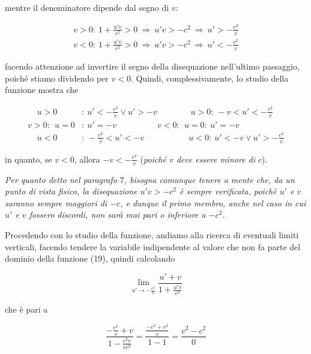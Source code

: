 \documentclass{article}
\begin{document}
mentre il denominatore dipende dal segno di \(v\):

\begin{align*}
    v > 0:\ 1 + \frac{u'v}{c^2} > 0\ \Rightarrow\ u'v > -c^2\ \Rightarrow\ u' > - \frac{c^2}{v} \\
    v < 0:\ 1 + \frac{u'v}{c^2} > 0\ \Rightarrow\ u'v > -c^2\ \Rightarrow\ u' < - \frac{c^2}{v}
\end{align*}

facendo attenzione ad invertire il segno della disequazione
nell'ultimo passaggio, poiché stiamo dividendo per \(v < 0\).
Quindi, complessivamente, lo studio della funzione mostra che

\begin{align*}
    \ \ \ \ \ u > 0 &:\ u' < - \frac{c^2}{v} \vee u' > -v\ \ \ \ \ \ \ \ \ \ \ \ \ \ \ \ \ \ u > 0 :\ -v < u' < - \frac{c^2}{v} \\
    v > 0:\ \ u = 0 &:\ u' = -v\ \ \ \ \ \ \ \ \ \ \ \ \ \ \ \ \ \ \ \ \ \ v < 0:\ \ u = 0 :\ u' = -v \\
    \ \ \ \ \ u < 0 &:\ - \frac{c^2}{v} < u' < -v\ \ \ \ \ \ \ \ \ \ \ \ \ \ \ \ \ \ \ \ \ \ \ \ u < 0 :\ u' < -v \vee u' > - \frac{c^2}{v}
\end{align*}

in quanto, se \(v < 0\), allora \(-v < - \frac{c^2}{v}\)
(\textit{poiché \(v\) deve essere minore di \(c\)}).\hfill\break

\textit{Per quanto detto nel paragrafo \(7\), bisogna comunque
tenere a mente che, da un punto di vista fisico, la disequazione
\(u'v > -c^2\) è sempre verificata, poichè \(u'\) e \(v\)
saranno sempre maggiori di \(-c\), e dunque il primo membro, anche
nel caso in cui \(u'\) e \(v\) fossero discordi, non
sarà mai pari o inferiore a \(-c^2\).}\hfill\break

Procedendo con lo studio della funzione, andiamo alla ricerca
di eventuali limiti verticali, facendo tendere la variabile
indipendente al valore che non fa parte del dominio della
funzione (19), quindi calcolando

\begin{equation}
    \lim_{u' \rightarrow - \frac{c^2}{v}}{\frac{u' + v}{1 + \frac{u'v}{c^2}}}
\end{equation}

che è pari a

\begin{equation}
    \frac{- \frac{c^2}{v} + v}{1 - \frac{c^2v}{vc^2}} = \frac{\frac{-c^2 + v^2}{v}}{1 - 1} = \frac{v^2 - c^2}{0}
\end{equation}
\end{document}
